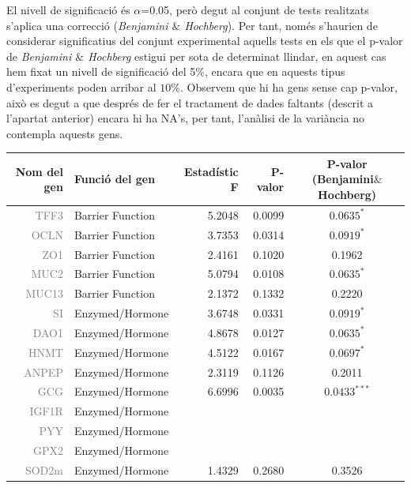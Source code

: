 \documentclass[english]{article}
\begin{document}
\noindent El nivell de significació és $\alpha$=0.05, però degut al conjunt de tests realitzats s'aplica una correcció (\textit{Benjamini $\&$ Hochberg}). Per tant, només s'haurien de considerar significatius del conjunt experimental aquells tests en els que el p-valor de \textit{Benjamini $\&$ Hochberg} estigui per sota de determinat llindar, en aquest cas hem fixat un nivell de significació del 5$\%$, encara que en aquests tipus d'experiments poden arribar al $10\%$. Observem que hi ha gens sense cap p-valor, això es degut a que després de fer el tractament de dades faltants (descrit a l'apartat anterior) encara hi ha NA's, per tant, l'anàlisi de la variància no contempla aquests gens.
\clearpage
\begin{table}[ht]
\centering
\begin{tabular}{rlrrc}
  \toprule
 {\textbf{Nom del gen}} & {\textbf{Funció del gen }} & {\textbf{Estadístic F}} & {\textbf{P-valor}} & {\textbf{P-valor (Benjamini$\&$Hochberg)}} \\
  \midrule
{\textcolor{gray}{TFF3}} & Barrier Function & 5.2048 & 0.0099 & $0.0635^{*}$  \\
  {\textcolor{gray}{OCLN}} & Barrier Function & 3.7353 & 0.0314 & $0.0919^{*}$  \\
  {\textcolor{gray}{ZO1}} & Barrier Function & 2.4161 & 0.1020 & 0.1962 \\
  {\textcolor{gray}{MUC2}} & Barrier Function & 5.0794 & 0.0108 & $0.0635^{*}$  \\
  {\textcolor{gray}{MUC13}} & Barrier Function & 2.1372 & 0.1332 & 0.2220 \\
  {\textcolor{gray}{SI}} & Enzymed/Hormone & 3.6748 & 0.0331 & $0.0919^{*}$  \\
  {\textcolor{gray}{DAO1}} & Enzymed/Hormone & 4.8678 & 0.0127 & $0.0635^{*}$  \\
  {\textcolor{gray}{HNMT}} & Enzymed/Hormone & 4.5122 & 0.0167 & $0.0697^{*}$  \\
  {\textcolor{gray}{ANPEP}} & Enzymed/Hormone & 2.3119 & 0.1126 & 0.2011 \\
  {\textcolor{gray}{GCG}} & Enzymed/Hormone & 6.6996 & 0.0035 & $0.0433^{***}$ \\
  {\textcolor{gray}{IGF1R}} & Enzymed/Hormone &  &  &  \\
  {\textcolor{gray}{PYY}} & Enzymed/Hormone &  &  &  \\
  {\textcolor{gray}{GPX2}} & Enzymed/Hormone &  &  &  \\
  {\textcolor{gray}{SOD2m}} & Enzymed/Hormone & 1.4329 & 0.2680 & 0.3526 \\

\end{tabular}
\end{table}
\end{document}
